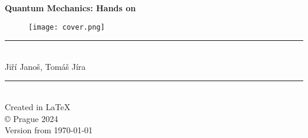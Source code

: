 \begin{titlepage}
\begin{center}
\vspace*{2cm}
{\Huge \textbf{Quantum Mechanics: Hands on}}

\bigskip

\begin{figure} [H]
\centering
\texttt{[image: cover.png]}
\end{figure}
\rule{0.8\textwidth}{0.02cm}\\

Jiří Janoš, Tomáš Jíra\\

\end{center}
\vfill
\begin{flushright}
\rule{3cm}{0.01cm} \\
Created in \LaTeX \\
\copyright \hspace{0.1cm} Prague 2024 \\
Version from \today
\end{flushright}
\end{titlepage}
